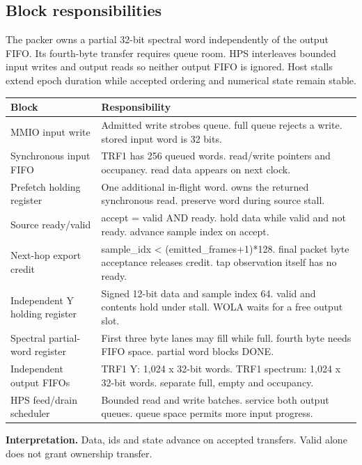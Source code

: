 \documentclass[11pt,letterpaper]{article}
\begin{document}
\subsection*{Block responsibilities}
The packer owns a partial 32-bit spectral word independently of the output FIFO. Its fourth-byte transfer requires queue room. HPS interleaves bounded input writes and output reads so neither output FIFO is ignored. Host stalls extend epoch duration while accepted ordering and numerical state remain stable.
\par\medskip\noindent
\begin{tabularx}{\linewidth}{@{}>{\raggedright\arraybackslash}p{1.65in}Y@{}}\toprule
\textbf{Block} & \textbf{Responsibility} \\ \midrule
MMIO input write & Admitted write strobes queue. full queue rejects a write. stored input word is 32 bits. \\[5pt]
Synchronous input FIFO & TRF1 has 256 queued words. read/write pointers and occupancy. read data appears on next clock. \\[5pt]
Prefetch holding register & One additional in-flight word. owns the returned synchronous read. preserve word during source stall. \\[5pt]
Source ready/valid & accept = valid AND ready. hold data while valid and not ready. advance sample index on accept. \\[5pt]
Next-hop export credit & sample\_idx < (emitted\_frames+1)*128. final packet byte acceptance releases credit. tap observation itself has no ready. \\[5pt]
Independent Y holding register & Signed 12-bit data and sample index 64. valid and contents hold under stall. WOLA waits for a free output slot. \\[5pt]
Spectral partial-word register & First three byte lanes may fill while full. fourth byte needs FIFO space. partial word blocks DONE. \\[5pt]
Independent output FIFOs & TRF1 Y: 1,024 x 32-bit words. TRF1 spectrum: 1,024 x 32-bit words. separate full, empty and occupancy. \\[5pt]
HPS feed/drain scheduler & Bounded read and write batches. service both output queues. queue space permits more input progress. \\[5pt]
\bottomrule\end{tabularx}
\vspace{8pt}
\noindent\textbf{Interpretation.} Data, ids and state advance on accepted transfers. Valid alone does not grant ownership transfer.
\clearpage
\end{document}
